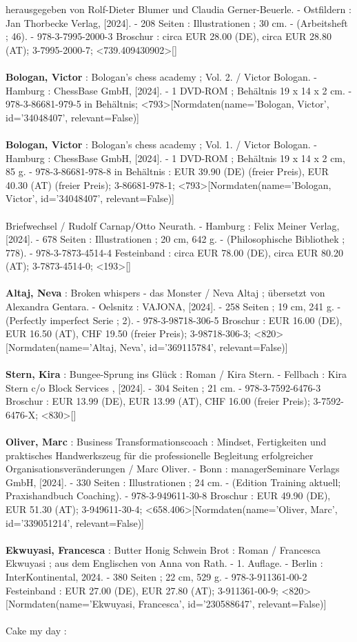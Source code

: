 \documentclass{article}
\begin{document}
\begin{multicols}{3}
herausgegeben von Rolf-Dieter Blumer und Claudia Gerner-Beuerle. - Ostfildern : Jan Thorbecke Verlag, [2024]. - 208 Seiten : Illustrationen ; 30 cm. - (Arbeitsheft ; 46). - 978-3-7995-2000-3 Broschur : circa EUR 28.00 (DE), circa EUR 28.80 (AT); 3-7995-2000-7; <739.409430902>[]\\\\\textbf{Bologan, Victor} : Bologan's chess academy ; Vol. 2. / Victor Bologan. - Hamburg : ChessBase GmbH, [2024]. - 1 DVD-ROM ; Behältnis 19 x 14 x 2 cm. - 978-3-86681-979-5 in Behältnis; <793>[Normdaten(name='Bologan, Victor', id='34048407', relevant=False)]\\\\\textbf{Bologan, Victor} : Bologan's chess academy ; Vol. 1. / Victor Bologan. - Hamburg : ChessBase GmbH, [2024]. - 1 DVD-ROM ; Behältnis 19 x 14 x 2 cm, 85 g. - 978-3-86681-978-8 in Behältnis : EUR 39.90 (DE) (freier Preis), EUR 40.30 (AT) (freier Preis); 3-86681-978-1; <793>[Normdaten(name='Bologan, Victor', id='34048407', relevant=False)]\\\\Briefwechsel / Rudolf Carnap/Otto Neurath. - Hamburg : Felix Meiner Verlag, [2024]. - 678 Seiten : Illustrationen ; 20 cm, 642 g. - (Philosophische Bibliothek ; 778). - 978-3-7873-4514-4 Festeinband : circa EUR 78.00 (DE), circa EUR 80.20 (AT); 3-7873-4514-0; <193>[]\\\\\textbf{Altaj, Neva} : Broken whispers - das Monster / Neva Altaj ; übersetzt von Alexandra Gentara. - Oelsnitz : VAJONA, [2024]. - 258 Seiten ; 19 cm, 241 g. - (Perfectly imperfect Serie ; 2). - 978-3-98718-306-5 Broschur : EUR 16.00 (DE), EUR 16.50 (AT), CHF 19.50 (freier Preis); 3-98718-306-3; <820>[Normdaten(name='Altaj, Neva', id='369115784', relevant=False)]\\\\\textbf{Stern, Kira} : Bungee-Sprung ins Glück : Roman / Kira Stern. - Fellbach : Kira Stern c/o Block Services , [2024]. - 304 Seiten ; 21 cm. - 978-3-7592-6476-3 Broschur : EUR 13.99 (DE), EUR 13.99 (AT), CHF 16.00 (freier Preis); 3-7592-6476-X; <830>[]\\\\\textbf{Oliver, Marc} : Business Transformationscoach : Mindset, Fertigkeiten und praktisches Handwerkszeug für die professionelle Begleitung erfolgreicher Organisationsveränderungen / Marc Oliver. - Bonn : managerSeminare Verlags GmbH, [2024]. - 330 Seiten : Illustrationen ; 24 cm. - (Edition Training aktuell; Praxishandbuch Coaching). - 978-3-949611-30-8 Broschur : EUR 49.90 (DE), EUR 51.30 (AT); 3-949611-30-4; <658.406>[Normdaten(name='Oliver, Marc', id='339051214', relevant=False)]\\\\\textbf{Ekwuyasi, Francesca} : Butter Honig Schwein Brot : Roman / Francesca Ekwuyasi ; aus dem Englischen von Anna von Rath. - 1. Auflage. - Berlin : InterKontinental, 2024. - 380 Seiten ; 22 cm, 529 g. - 978-3-911361-00-2 Festeinband : EUR 27.00 (DE), EUR 27.80 (AT); 3-911361-00-9; <820>[Normdaten(name='Ekwuyasi, Francesca', id='230588647', relevant=False)]\\\\Cake my day : 
\end{multicols}
\end{document}
